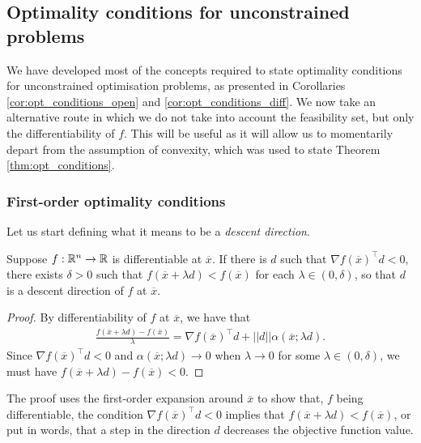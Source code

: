 \subsection{Optimality conditions for unconstrained problems}

We have developed most of the concepts required to state optimality conditions for unconstrained optimisation problems, as presented in Corollaries \ref{cor:opt_conditions_open} and \ref{cor:opt_conditions_diff}. We now take an alternative route in which we do not take into account the feasibility set, but only the differentiability of $f$. This will be useful as it will allow us to momentarily depart from the assumption of convexity, which was used to state Theorem \ref{thm:opt_conditions}. 

\subsubsection{First-order optimality conditions}

Let us start defining what it means to be a \emph{descent direction}.

\begin{theorem}\label{thm:descent_dir}
Suppose $f: \mathbb{R}^n \to \mathbb{R}$ is differentiable at $\overline{x}$. If there is $d$ such that $\nabla f(\overline{x})^\top d < 0$, there exists $\delta > 0$ such that $f(\overline{x} + \lambda d) < f(\overline{x})$ for each $\lambda \in (0, \delta)$, so that $d$ is a descent direction of $f$ at $\overline{x}$.
\end{theorem}
%
\begin{proof}
By differentiability of $f$ at $\overline{x}$, we have that 
\begin{align*}
\frac{f(\overline{x} + \lambda d)-f(\overline{x})}{\lambda} = \nabla f(\overline{x})^\top d + ||d||\alpha(\overline{x};\lambda d).
\end{align*}
Since $\nabla f(\overline{x})^\top d < 0$ and $\alpha(\overline{x};\lambda d) \rightarrow 0$ when $\lambda \rightarrow 0$ for some $\lambda \in (0, \delta)$, we must have $f(\overline{x} + \lambda d)-f(\overline{x}) < 0$.
\end{proof}

The proof uses the first-order expansion around $\overline{x}$ to show that, $f$ being differentiable, the condition $\nabla f(\overline{x})^\top d < 0$ implies that $ f(\overline{x} + \lambda d) < f(\overline{x})$, or put in words, that a step in the direction $d$ decreases the objective function value.

